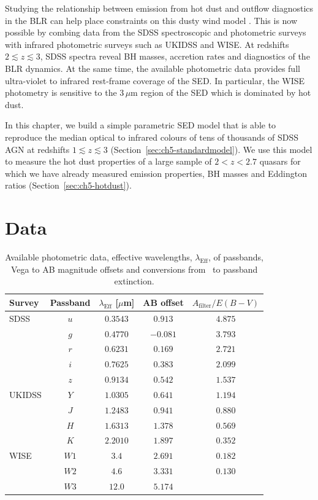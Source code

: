 Studying the relationship between emission from hot dust and outflow diagnostics in the BLR can help place constraints on this dusty wind model \citep[e.g.][]{wang13}.
This is now possible by combing data from the SDSS spectroscopic and photometric surveys with infrared photometric surveys such as UKIDSS and WISE.
At redshifts $2\lesssim z \lesssim3$, SDSS spectra reveal BH masses, accretion rates and diagnostics of the BLR dynamics.
At the same time, the available photometric data provides full ultra-violet to infrared rest-frame coverage of the SED.
In particular, the WISE photometry is sensitive to the $3$\,$\mu$m region of the SED which is dominated by hot dust.

In this chapter, we build a simple parametric SED model that is able to reproduce the median optical to infrared colours of tens of thousands of SDSS AGN at redshifts $1 \lesssim z \lesssim 3$ (Section~\ref{sec:ch5-standardmodel}).
We use this model to measure the hot dust properties of a large sample of $2 < z < 2.7$ quasars for which we have already measured  emission properties, BH masses and Eddington ratios (Section~\ref{sec:ch5-hotdust}).

\section{Data}

\begin{table}
  \footnotesize
  \centering
  \begin{tabular}{lcccc}
    \hline
    Survey & Passband & $\lambda_{\text{Eff}}$ [$\mu$m] & AB offset & $A_{\text{filter}}/E(B-V)$ \\
    \hline
    SDSS & $u$ & $0.3543$ & $ 0.913$ & $4.875$ \\
         & $g$ & $0.4770$ & $-0.081$ & $3.793$ \\
         & $r$ & $0.6231$ & $ 0.169$ & $2.721$ \\
         & $i$ & $0.7625$ & $ 0.383$ & $2.099$ \\
         & $z$ & $0.9134$ & $ 0.542$ & $1.537$ \\
    UKIDSS & $Y$ & $1.0305$ &  $0.641$ & $1.194$ \\
           & $J$ & $1.2483$ &  $0.941$ & $0.880$ \\
           & $H$ & $1.6313$ &  $1.378$ & $0.569$ \\
           & $K$ & $2.2010$ &  $1.897$ & $0.352$ \\
    WISE & $W1$ & $3.4$ & $2.691$ & $0.182$\\
         & $W2$ & $4.6$ & $3.331$ & $0.130$\\
         & $W3$ & $12.0$ & $5.174$ & \\
    \hline
  \end{tabular}
  \caption[{Available photometric data, effective wavelengths of passbands, Vega to AB magnitude offsets and conversions from \ebv\, to passband extinction.}]{Available photometric data, effective wavelengths, $\lambda_{\text{Eff}}$, of passbands, Vega to AB magnitude offsets and conversions from \ebv\, to passband extinction.}
  \label{tab:photometry}
\end{table}

